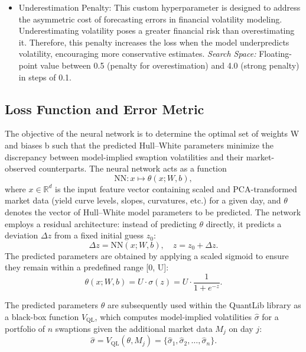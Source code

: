 {\begin{itemize}
	\item Underestimation Penalty: This custom hyperparameter is designed to address the asymmetric cost of forecasting errors in financial volatility modeling. Underestimating volatility poses a greater financial risk than overestimating it. Therefore, this penalty increases the loss when the model underpredicts volatility, encouraging more conservative estimates. \newline
	      \textit{Search Space:} Floating-point value between 0.5 (penalty for overestimation) and 4.0 (strong penalty) in steps of 0.1.
\end{itemize}

\subsection{Loss Function and Error Metric}

The objective of the neural network is to determine the optimal set of weights W and biases b such that the predicted Hull--White parameters minimize the discrepancy between model-implied swaption volatilities and their market-observed counterparts. The neural network acts as a function
\begin{equation}
	\text{NN} : x \mapsto \theta(x; W, b),
\end{equation}
where $x \in \mathbb{R}^d$ is the input feature vector containing scaled and PCA-transformed market data (yield curve levels, slopes, curvatures, etc.) for a given day, and $\theta$ denotes the vector of Hull--White model parameters to be predicted. The network employs a residual architecture: instead of predicting $\theta$ directly, it predicts a deviation $\Delta z$ from a fixed initial guess $z_0$:
\begin{equation}
	\Delta z = \text{NN}(x; W, b), \quad
	z = z_0 + \Delta z.
\end{equation}
The predicted parameters are obtained by applying a scaled sigmoid to ensure they remain within a predefined range [0, U]:
\begin{equation}
	\theta(x; W, b) = U \cdot \sigma(z) = U \cdot \frac{1}{1 + e^{-z}}.
\end{equation}

The predicted parameters $\theta$ are subsequently used within the QuantLib library as a black-box function $V_{\text{QL}}$, which computes model-implied volatilities $\hat{\sigma}$ for a portfolio of $n$ swaptions given the additional market data $M_j$ on day $j$:
\begin{equation}
	\hat{\sigma} = V_{\text{QL}}(\theta, M_j) = \{\hat{\sigma}_1, \hat{\sigma}_2, \dots, \hat{\sigma}_n\}.
\end{equation}

}
